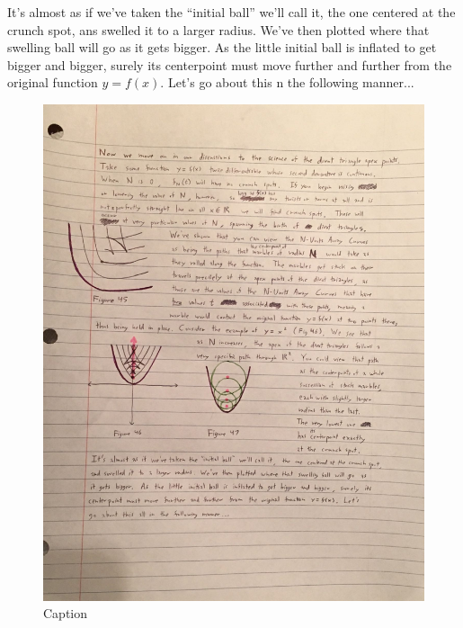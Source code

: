It's almost as if we've taken the ``initial ball'' we'll call it, the one centered at the crunch spot, ans swelled it to a larger radius. We've then plotted where that swelling ball will go as it gets bigger. As the little initial ball is inflated to get bigger and bigger, surely its centerpoint must move further and further from the original function $y = f(x)$. Let's go about this n the following manner...

\begin{figure}[H]
    \centering
    \begin{minipage}[b]{0.5\linewidth}
        \includegraphics[width=.9\linewidth]{solving-divot-paths-img/Fig 12-46.png}
        \caption{Caption}
        \label{fig:fig12-46}
    \end{minipage}
    \begin{minipage}[b]{0.5\linewidth}

\end{minipage}
\end{figure}
